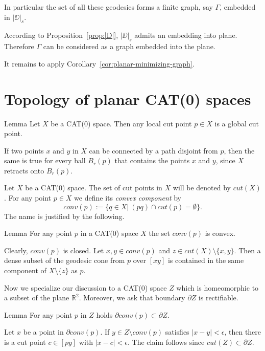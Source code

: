 \documentclass[a4paper,10pt]{amsart}
\begin{document}

In particular the set of all these geodesics forms a finite graph, say $\Gamma$,
embedded in $|\DD|_s$. 

According to Proposition~\ref{prop:|D|},
$|\DD|_s$ admits an embedding into plane.
Therefore $\Gamma$ can be considered as a graph embedded into the plane.

It remains to apply Corollary~\ref{cor:planar-minimizing-graph}.
\qeds

\section{Topology of planar CAT(0) spaces}

\begin{thm}{Lemma}
 Let $X$ be a CAT(0) space. Then any local cut point $p\in X$ is a global cut point.
\end{thm}

If two points $x$ and $y$ in $X$ can be connected by a path disjoint from $p$, then
the same is true for every ball $B_r(p)$ that contains the points $x$ and $y$, since 
$X$ retracts onto $B_r(p)$.
\qeds

Let $X$ be a CAT(0) space. The set of cut points in $X$ will be denoted by $cut(X)$. For any point $p\in X$ we define its {\em convex component}
by 
$$
conv(p):=\{q\in X|\ (pq)\cap cut(p)=\emptyset \}.
$$
The name is justified by the following.

\begin{thm}{Lemma}
 For any point $p$ in a CAT(0) space $X$ the set $conv(p)$  is convex.
\end{thm}

Clearly, $conv(p)$ is closed. Let $x,y\in conv(p)$ and $z\in cut(X)\setminus\{x,y\}$. Then a dense subset
of the geodesic cone from $p$ over $[xy]$ is contained in the same component of $X\setminus \{z\}$ as $p$.
\qeds

Now we specialize our discussion to a CAT(0) space $Z$ which is homeomorphic to a subset of the plane $\mathbb{R}^2$. 
Moreover,
we ask that boundary $\partial Z$ is rectifiable.

\begin{thm}{Lemma}
 For any point $p$ in $Z$ holds $\partial conv(p)\subset\partial Z$.
\end{thm}

Let $x$ be a point in $\partial conv(p)$. If $y\in Z\setminus conv(p)$ satisfies $|x-y|<\epsilon$,
then there is a cut point $c\in[py]$ with $|x-c|<\epsilon$. The claim follows since $cut(Z)\subset\partial Z$.
\qeds
\end{document}
